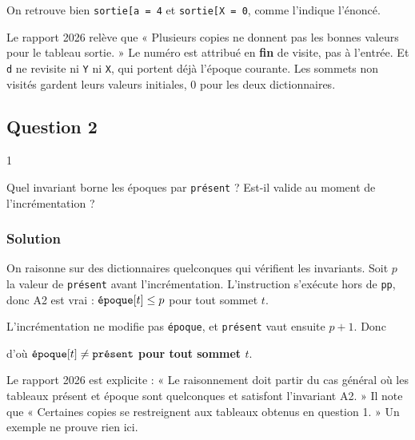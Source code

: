\documentclass[11pt,a4paper]{article}
\newcommand{\equationajustee}[1]{%
  \sbox{\boiteequation}{$\displaystyle #1$}%
  \ifdim\wd\boiteequation>\linewidth
    \[\resizebox{\linewidth}{!}{\usebox{\boiteequation}}\]%
  \else
    \[#1\]%
  \fi}
\begin{document}
On retrouve bien \texttt{sortie{[}\textquotesingle{}a\textquotesingle{}{]}\ =\ 4} et \texttt{sortie{[}\textquotesingle{}X\textquotesingle{}{]}\ =\ 0}, comme l'indique l'énoncé.

\begin{piege}

Le rapport 2026 relève que « Plusieurs copies ne donnent pas les bonnes valeurs pour le tableau sortie. » Le numéro est attribué en \textbf{fin} de visite, pas à l'entrée. Et \texttt{d} ne revisite ni \texttt{Y} ni \texttt{X}, qui portent déjà l'époque courante. Les sommets non visités gardent leurs valeurs initiales, 0 pour les deux dictionnaires.

\end{piege}

\hypertarget{question-2}{%
\subsection{Question 2}\label{question-2}}

\begin{indication}{1}

Quel invariant borne les époques par \texttt{présent} ? Est-il valide au moment de l'incrémentation ?

\end{indication}

\hypertarget{solution-1}{%
\subsubsection{Solution}\label{solution-1}}

On raisonne sur des dictionnaires quelconques qui vérifient les invariants. Soit \(p\) la valeur de \texttt{présent} avant l'incrémentation. L'instruction s'exécute hors de \texttt{pp}, donc A2 est vrai : \(\texttt{\text{époque}}[t]\le p\) pour tout sommet \(t\).

L'incrémentation ne modifie pas \texttt{époque}, et \texttt{présent} vaut ensuite \(p+1\). Donc

\equationajustee{\texttt{\text{époque}}[t]\le p<p+1=\texttt{\text{présent}},}

d'où \textbf{\(\texttt{\text{époque}}[t]\neq\texttt{\text{présent}}\) pour tout sommet \(t\)}.

\begin{jury}

Le rapport 2026 est explicite : « Le raisonnement doit partir du cas général où les tableaux présent et époque sont quelconques et satisfont l'invariant A2. » Il note que « Certaines copies se restreignent aux tableaux obtenus en question 1. » Un exemple ne prouve rien ici.

\end{jury}
\end{document}
